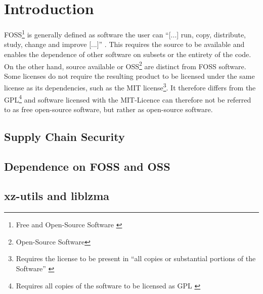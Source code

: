 \section{Introduction}

FOSS\footnote{Free and Open-Source Software \cite{stallmann2021copyleft}} is
generally defined as software the user can ``[...] run, copy, distribute,
study, change and improve [...]'' \cite{fsf2024whycopylef}. This requires the
source to be available and enables the dependence of other software on subsets
or the entirety of the code. On the other hand, source available or
OSS\footnote{Open-Source Software} are distinct from FOSS software. Some
licenses do not require the resulting product to be licensed under the same
license as its dependencies, such as the MIT license\footnote{Requires the
license to be present in ``all copies or substantial portions of the Software''
\cite{osorg2024mit}}. It therefore differs from the GPL\footnote{Requires all
copies of the software to be licensed as GPL \cite{osorg2024gpl}} and software
licensed with the MIT-Licence can therefore not be referred to as free
open-source software, but rather as open-source software.

\subsection{Supply Chain Security}
\subsection{Dependence on FOSS and OSS}
\subsection{xz-utils and liblzma}

